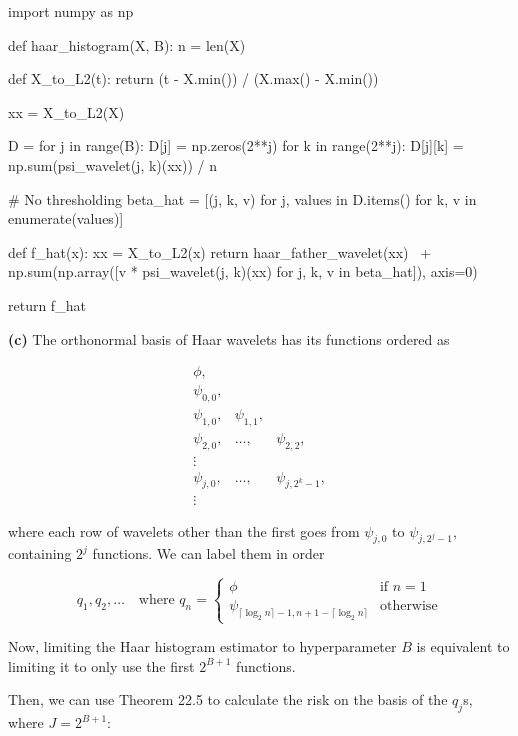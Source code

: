 \begin{python}
import numpy as np

def haar_histogram(X, B): 
    n = len(X)
    
    def X_to_L2(t):
        return (t - X.min()) / (X.max() - X.min())
    
    xx = X_to_L2(X)

    D = {}
    for j in range(B):
        D[j] = np.zeros(2**j)
        for k in range(2**j):
            D[j][k] = np.sum(psi_wavelet(j, k)(xx)) / n
            
    # No thresholding
    beta_hat = [(j, k, v) for j, values in D.items() for k, v in enumerate(values)]
    
    def f_hat(x):
        xx = X_to_L2(x)
        return haar_father_wavelet(xx) \
            + np.sum(np.array([v * psi_wavelet(j, k)(xx) for j, k, v in beta_hat]), axis=0)
    
    return f_hat
\end{python}


\textbf{(c)} The orthonormal basis of Haar wavelets has its functions
ordered as

\[ 
\begin{array}{ccc}
\phi, \\
\psi_{0, 0}, \\
\psi_{1, 0}, & \psi_{1, 1}, \\
\psi_{2, 0}, & \dots, & \psi_{2, 2}, \\
\vdots \\
\psi_{j, 0}, & \dots, & \psi_{j, 2^{k} - 1}, \\
\vdots
\end{array}
\]

where each row of wavelets other than the first goes from
\(\psi_{j, 0}\) to \(\psi_{j, 2^{j} - 1}\), containing \(2^{j}\) functions.
We can label them in order

\[ q_{1}, q_{2}, \dots 
\quad \text{where }q_{n} = \begin{cases}
\phi & \text{if }  n = 1 \\
\psi_{\lceil \log_{2} n \rceil- 1, n + 1 - \lceil \log_{2} n \rceil } & \text{otherwise}
\end{cases}\]

Now, limiting the Haar histogram estimator to hyperparameter \(B\) is
equivalent to limiting it to only use the first \(2^{B + 1}\) functions.

Then, we can use Theorem 22.5 to calculate the risk on the basis of the
\(q_{j}\)s, where \(J = 2^{B + 1}\):

